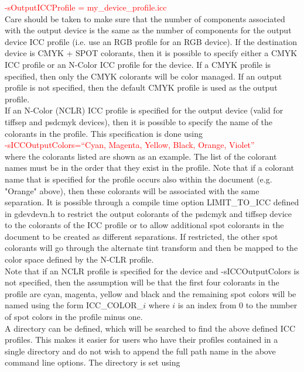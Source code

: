 \documentclass[12pt,notitlepage]{article}
\begin{document}
\textcolor{red}{-sOutputICCProfile = my\_device\_profile.icc}\\

 \noindent Care should be taken to make sure that the number of components associated with the output device is the same as the number of components for the output device ICC profile (i.e. use an RGB profile for an RGB device).  If the destination device is CMYK + SPOT colorants, then it is possible to specify either a CMYK ICC profile or an N-Color ICC profile for the device.  If a CMYK profile is specified, then only the CMYK colorants will be color managed.  If an output profile is not specified, then the default CMYK profile is used as the output profile.\\

 If an N-Color (NCLR) ICC profile is specified for the output device (valid for tiffsep and psdcmyk devices), then it is possible to specify the name of the colorants in the profile.   This specification is done using\\

\textcolor{red}{-sICCOutputColors=``Cyan, Magenta, Yellow, Black, Orange, Violet''}\\

 \noindent where the colorants listed are shown as an example.  The list of the colorant names must be in the order that they exist in the profile.  Note that if a colorant name that is specified for the profile occurs also within the document (e.g. "Orange" above), then these colorants will be associated with the same separation. It is possible through a compile time option LIMIT\_TO\_ICC defined in gdevdevn.h to restrict the output colorants of the psdcmyk and tiffsep device to the colorants of the ICC profile or to allow additional spot colorants in the document to be created as different separations. If restricted, the other spot colorants will go through the alternate tint transform and then be mapped to the color space defined by the N-CLR profile.\\

 Note that if an NCLR profile is specified for the device and -sICCOutputColors is not specified, then the assumption will be that the first four colorants in the profile are cyan, magenta, yellow and black and the remaining spot colors will be named using the form ICC\_COLOR\_$i$ where $i$ is an index from 0 to the number of spot colors in the profile minus one.\\

A directory can be defined, which will be searched to find the above defined ICC profiles.  This makes it easier for users who have their profiles contained in a single directory and do not wish to append the full path name in the above command line options.  The directory is set using\\
\end{document}
